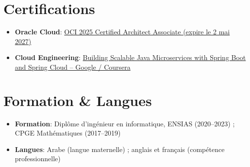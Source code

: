 \documentclass[a4paper,10pt]{article}
\newcommand{\resumeSkill}[2]{
  \item\small{\textbf{#1}{: #2 \vspace{-2pt}}}
}
\newcommand{\resumeCertification}[2]{
  \item\small{\textbf{#1}{: #2 \vspace{-2pt}}}
}
\newcommand{\resumeSkillListStart}{\begin{itemize}[leftmargin=0.15in, label={}]}
\newcommand{\resumeSkillListEnd}{\end{itemize}}
\begin{document}
\section{Certifications}
\resumeSkillListStart
  \resumeCertification{Oracle Cloud}{\href{https://catalog-education.oracle.com/ords/certview/sharebadge?id=5DCB8BDEE987AB0D33F444C6F0144AEC8E9596EF9BA9A3528575CBDC6F3F67AE}{OCI 2025 Certified Architect Associate (expire le 2 mai 2027)}}
  \resumeCertification{Cloud Engineering}{\href{https://www.coursera.org/account/accomplishments/certificate/SD425CFMRN48}{Building Scalable Java Microservices with Spring Boot and Spring Cloud -- Google / Coursera}}
\resumeSkillListEnd

\section{Formation \& Langues}
\resumeSkillListStart
  \resumeSkill{Formation}{Diplôme d'ingénieur en informatique, ENSIAS (2020--2023) ; CPGE Mathématiques (2017--2019)}
  \resumeSkill{Langues}{Arabe (langue maternelle) ; anglais et français (compétence professionnelle)}
\resumeSkillListEnd

\end{document}
